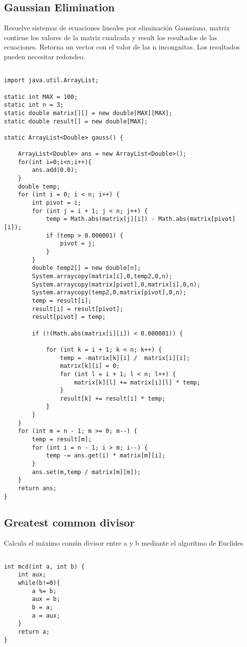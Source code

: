 \documentclass[11pt,letterpaper,twocolumn,twosided]{article}
\begin{document}
\subsection{Gaussian Elimination}
Resuelve sistemas de ecuaciones lineales por eliminaci\'on Gaussiana. matrix contiene los valores de la matriz cuadrada y result los resultados de las ecuaciones. Retorna un vector con el valor de las n incongnitas. Los resultados pueden necesitar redondeo.

\begin{lstlisting}

import java.util.ArrayList;

static int MAX = 100;
static int n = 3;
static double matrix[][] = new double[MAX][MAX];
static double result[] = new double[MAX];

static ArrayList<Double> gauss() {
	
  	ArrayList<Double> ans = new ArrayList<Double>();
  	for(int i=0;i<n;i++){
  		ans.add(0.0);
  	}
  	double temp;
	for (int i = 0; i < n; i++) {
    	int pivot = i;
	    for (int j = i + 1; j < n; j++) {
	    	temp = Math.abs(matrix[j][i]) - Math.abs(matrix[pivot][i]);
	      	if (temp > 0.000001) {
	        	pivot = j;
	      	}
	    }
	    double temp2[] = new double[n];
	    System.arraycopy(matrix[i],0,temp2,0,n);
	    System.arraycopy(matrix[pivot],0,matrix[i],0,n);
	    System.arraycopy(temp2,0,matrix[pivot],0,n);
	    temp = result[i];
	    result[i] = result[pivot];
	    result[pivot] = temp;
	    
	    if (!(Math.abs(matrix[i][i]) < 0.000001)) {
	    	
	    	for (int k = i + 1; k < n; k++) {
		      	temp = -matrix[k][i] /  matrix[i][i];
		      	matrix[k][i] = 0;
		      	for (int l = i + 1; l < n; l++) {
		        	matrix[k][l] += matrix[i][l] * temp;
		      	}
		      	result[k] += result[i] * temp;
		    }
	    }
  	}
  	for (int m = n - 1; m >= 0; m--) {
    	temp = result[m];
    	for (int i = n - 1; i > m; i--) {
    		temp -= ans.get(i) * matrix[m][i];
    	}
    	ans.set(m,temp / matrix[m][m]);
  	}
  	return ans;
}
\end{lstlisting}

\subsection{Greatest common divisor}
Calcula el m\'aximo com\'un divisor entre a y b mediante el algoritmo de Euclides

\begin{lstlisting}

int mcd(int a, int b) {
	int aux;
	while(b!=0){
		a %= b;
		aux = b;
		b = a;
		a = aux;
	}
	return a;
}
\end{lstlisting}
\end{document}
